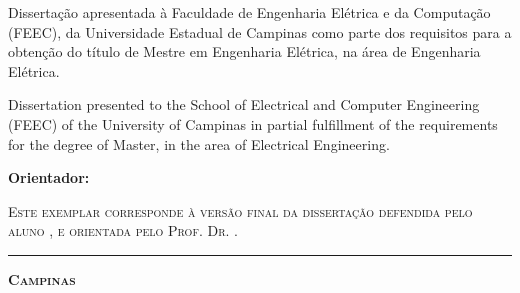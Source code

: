 {
\vspace{1cm}
\begin{flushright}
  \begin{minipage}[c]{.5\textwidth}
    Dissertação apresentada à Faculdade de Engenharia Elétrica e da Computação (FEEC), da Universidade Estadual de Campinas como parte dos requisitos para a obtenção do título de Mestre em Engenharia Elétrica, na área de Engenharia Elétrica.
  \end{minipage}
\end{flushright}

\begin{flushright}
  \begin{minipage}[c]{.5\textwidth}
Dissertation presented to the School of Electrical and Computer Engineering (FEEC) of the University of Campinas in partial fulfillment of the requirements for the degree of Master, in the area of Electrical Engineering. 
  \end{minipage}
\end{flushright}
\vspace{1cm}


\noindent
\textbf{Orientador: \orientador}
\vspace{.5cm}

\noindent
\begin{minipage}[c]{.5\textwidth}
  {\footnotesize\textsc{Este exemplar corresponde à versão final da dissertação
  defendida pelo aluno \autor, e orientada pelo Prof. Dr. \orientador.
  }}
\end{minipage}
\vspace{1cm}

\noindent
{
\vspace{1cm}
\noindent
\rule[1pt]{7cm}{.5pt}  %
}
\vspace{.5cm}
}








\begin{center}
  {\small\textbf{\textsc{ Campinas \\ \ano}}}
\end{center}

